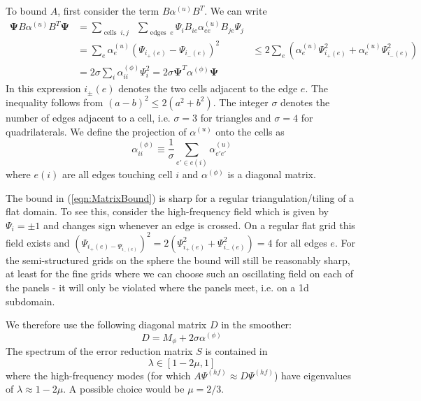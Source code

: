 \documentclass[12pt]{article}
\renewcommand{\vec}[1]{\boldsymbol{#1}}
\begin{document}
To bound $A$, first consider the term $B\alpha^{(u)} B^T$. We can write
\begin{equation}
 \begin{aligned}
  \vec{\Psi} B \alpha^{(u)} B^T \vec{\Psi} &= \sum_{\operatorname{cells}\;i,j}\;\;\sum_{\operatorname{edges}\;e} \Psi_i B_{ie} \alpha^{(u)}_{ee} B_{je} \Psi_j 
\\
  &= \sum_{e} \alpha_e^{(u)} \left(\Psi_{i_+(e)}-\Psi_{i_-(e)}\right)^2
  & \le 2\sum_e\left(\alpha_e^{(u)} \Psi_{i_+(e)}^2+\alpha_e^{(u)} \Psi_{i_-(e)}^2\right)\\
  &= 2 \sigma \sum_i \alpha_{ii}^{(\phi)} \Psi_i ^2 = 2\sigma \vec{\Psi}^T \alpha^{(\phi)}\vec{\Psi}
 \end{aligned}\label{eqn:MatrixBound}
\end{equation}
In this expression $i_{\pm}(e)$ denotes the two cells adjacent to the edge $e$. The inequality follows from $(a-b)^2 \le 2(a^2+b^2)$. The integer $\sigma$ denotes the number of edges adjacent to a cell, i.e. $\sigma=3$ for triangles and $\sigma=4$ for quadrilaterals. We define the projection of $\alpha^{(u)}$ onto the  cells as 
\begin{equation}
  \alpha^{(\phi)}_{ii} \equiv \frac{1}{\sigma} \sum_{e'\in e(i)} \alpha_{e'e'}^{(u)}
\end{equation}
where $e(i)$ are all edges touching cell $i$ and $\alpha^{(\phi)}$ is a diagonal matrix.

The bound in (\ref{eqn:MatrixBound}) is sharp for a regular triangulation/tiling of a flat domain. To see this, consider the high-frequency field which is given by $\Psi_i = \pm 1$ and changes sign whenever an edge is crossed. On a regular flat grid this field exists and $(\Psi_{i_+(e)-\Psi_{i_-(e)}})^2 = 2 (\Psi_{i_+(e)}^2+\Psi_{i_-(e)}^2) = 4$ for all edges $e$. For the semi-structured grids on the sphere the bound will still be reasonably sharp, at least for the fine grids where we can choose such an oscillating field on each of the panels - it will only be violated where the panels meet, i.e. on a 1d subdomain.

We therefore use the following diagonal matrix $D$ in the smoother:
\begin{equation}
  D = M_{\phi} + 2\sigma \alpha^{(\phi)}
\end{equation}
The spectrum of the error reduction matrix $S$ is contained in
\begin{equation}
  \lambda \in [1-2\mu,1]
\end{equation}
where the high-frequency modes (for which $A\Psi^{(hf)}\approx D\Psi^{(hf)}$) have eigenvalues of $\lambda \approx 1-2\mu$. A possible choice would be $\mu=2/3$.
\end{document}
